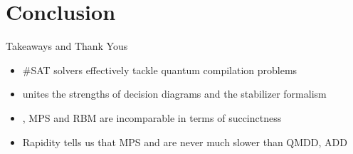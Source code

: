 \section{Conclusion}

\begin{refsection}
\begin{frame}{Takeaways and Thank Yous}

\vspace{-1em}

\begin{itemize}
	\item \#SAT solvers effectively tackle quantum compilation problems
	\item \limdd unites the strengths of decision diagrams and the stabilizer formalism
	\item \limdd, MPS and RBM are incomparable in terms of succinctness
	\item Rapidity tells us that MPS and \limdd are never much slower than QMDD, ADD
\end{itemize}


\vspace{2em}

\pause


\end{frame}
\end{refsection}
